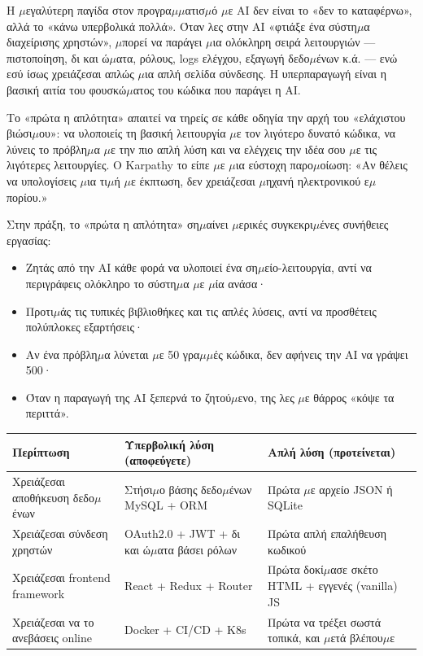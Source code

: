 Η $\mu$εγαλύτερη παγίδα στον προγρα$\mu$$\mu$ατισ$\mu$ό $\mu$ε AI δεν είναι το «δεν το καταφέρνω», αλλά το «κάνω υπερβολικά πολλά». Όταν λες στην AI «φτιάξε ένα σύστη$\mu$α διαχείρισης χρηστών», $\mu$πορεί να παράγει $\mu$ια ολόκληρη σειρά λειτουργιών — πιστοποίηση, δι και ώ$\mu$ατα, ρόλους, logs ελέγχου, εξαγωγή δεδο$\mu$ένων κ.ά. — ενώ εσύ ίσως χρειάζεσαι απλώς $\mu$ια απλή σελίδα σύνδεσης. Η υπερπαραγωγή είναι η βασική αιτία του φουσκώ$\mu$ατος του κώδικα που παράγει η AI.

Το «πρώτα η απλότητα» απαιτεί να τηρείς σε κάθε οδηγία την αρχή του «ελάχιστου βιώσι$\mu$ου»: να υλοποιείς τη βασική λειτουργία $\mu$ε τον λιγότερο δυνατό κώδικα, να λύνεις το πρόβλη$\mu$α $\mu$ε την πιο απλή λύση και να ελέγχεις την ιδέα σου $\mu$ε τις λιγότερες λειτουργίες. Ο Karpathy το είπε $\mu$ε $\mu$ια εύστοχη παρο$\mu$οίωση: «Αν θέλεις να υπολογίσεις $\mu$ια τι$\mu$ή $\mu$ε έκπτωση, δεν χρειάζεσαι $\mu$ηχανή ηλεκτρονικού ε$\mu$πορίου.»

Στην πράξη, το «πρώτα η απλότητα» ση$\mu$αίνει $\mu$ερικές συγκεκρι$\mu$ένες συνήθειες εργασίας:

\begin{itemize}
  \item Ζητάς από την AI κάθε φορά να υλοποιεί ένα ση$\mu$είο-λειτουργία, αντί να περιγράφεις ολόκληρο το σύστη$\mu$α $\mu$ε $\mu$ία ανάσα·
  \item Προτι$\mu$άς τις τυπικές βιβλιοθήκες και τις απλές λύσεις, αντί να προσθέτεις πολύπλοκες εξαρτήσεις·
  \item Αν ένα πρόβλη$\mu$α λύνεται $\mu$ε 50 γρα$\mu$$\mu$ές κώδικα, δεν αφήνεις την AI να γράψει 500·
  \item Όταν η παραγωγή της AI ξεπερνά το ζητού$\mu$ενο, της λες $\mu$ε θάρρος «κόψε τα περιττά».
\end{itemize}

\begin{center}
\begin{tabularx}{\linewidth}{|X|X|X|}
\hline
\textbf{Περίπτωση} & \textbf{Υπερβολική λύση (αποφεύγετε)} & \textbf{Απλή λύση (προτείνεται)} \tabularnewline
\hline
Χρειάζεσαι αποθήκευση δεδο$\mu$ένων & Στήσι$\mu$ο βάσης δεδο$\mu$ένων MySQL + ORM & Πρώτα $\mu$ε αρχείο JSON ή SQLite \tabularnewline
Χρειάζεσαι σύνδεση χρηστών & OAuth2.0 + JWT + δι και ώ$\mu$ατα βάσει ρόλων & Πρώτα απλή επαλήθευση κωδικού \tabularnewline
Χρειάζεσαι frontend framework & React + Redux + Router & Πρώτα δοκί$\mu$ασε σκέτο HTML + εγγενές (vanilla) JS \tabularnewline
Χρειάζεσαι να το ανεβάσεις online & Docker + CI/CD + K8s & Πρώτα να τρέξει σωστά τοπικά, και $\mu$ετά βλέπου$\mu$ε \tabularnewline
\hline
\end{tabularx}
\end{center}

